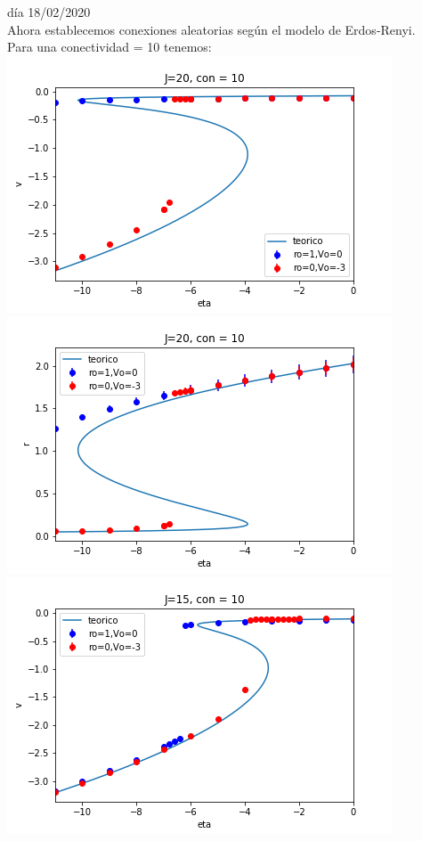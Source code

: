 \documentclass[a4paper]{article}
\begin{document}
día 18/02/2020\\
Ahora establecemos conexiones aleatorias según el modelo de Erdos-Renyi.\\
Para una conectividad = 10 tenemos:\\
\includegraphics[scale=0.7]{v_vs_eta_J20_con10.png}\\
\includegraphics[scale=0.7]{r_vs_eta_J20_con10.png}\\
\includegraphics[scale=0.7]{v_vs_eta_J15_con10.png}\\
\end{document}
